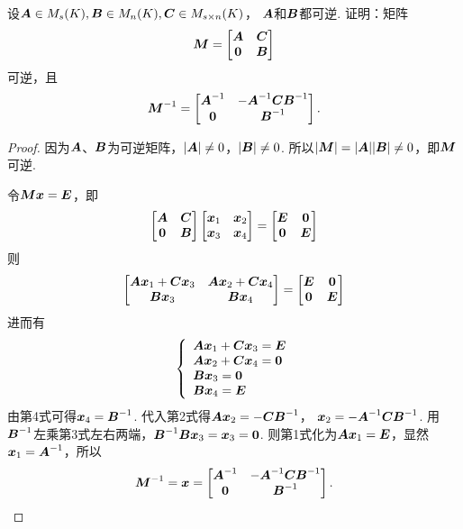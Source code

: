 \begin{example}\label{example:可逆矩阵.分块上三角矩阵的逆}
设\(\vb{A} \in M_s(K),
\vb{B} \in M_n(K),
\vb{C} \in M_{s \times n}(K)\)，
\(\vb{A}\)和\(\vb{B}\)都可逆.
证明：矩阵\[
	\vb{M} = \begin{bmatrix}
		\vb{A} & \vb{C} \\
		\vb0 & \vb{B}
	\end{bmatrix}
\]可逆，且\[
	\vb{M}^{-1} = \begin{bmatrix}
		\vb{A}^{-1} & -\vb{A}^{-1} \vb{C} \vb{B}^{-1} \\
		\vb0 & \vb{B}^{-1}
	\end{bmatrix}.
\]
\begin{proof}
因为\(\vb{A}\)、\(\vb{B}\)为可逆矩阵，\(\abs{\vb{A}} \neq 0\)，\(\abs{\vb{B}} \neq 0\).
所以\(\abs{\vb{M}}=\abs{\vb{A}}\abs{\vb{B}} \neq 0\)，即\(\vb{M}\)可逆.

令\(\vb{M}\vb{x}=\vb{E}\)，即\[
	\begin{bmatrix}
		\vb{A} & \vb{C} \\
		\vb0 & \vb{B}
	\end{bmatrix}
	\begin{bmatrix}
		\vb{x}_1 & \vb{x}_2 \\
		\vb{x}_3 & \vb{x}_4
	\end{bmatrix}
	= \begin{bmatrix}
		\vb{E} & \vb0 \\
		\vb0 & \vb{E}
	\end{bmatrix}
\]则\[
	\begin{bmatrix}
		\vb{A}\vb{x}_1+\vb{C}\vb{x}_3 & \vb{A}\vb{x}_2+\vb{C}\vb{x}_4 \\
		\vb{B}\vb{x}_3 & \vb{B}\vb{x}_4
	\end{bmatrix}
	= \begin{bmatrix}
		\vb{E} & \vb0 \\
		\vb0 & \vb{E}
	\end{bmatrix}
\]
进而有\[
	\left\{ \begin{array}{l}
		\vb{A}\vb{x}_1+\vb{C}\vb{x}_3 = \vb{E} \\
		\vb{A}\vb{x}_2+\vb{C}\vb{x}_4 = \vb0 \\
		\vb{B}\vb{x}_3 = \vb0 \\
		\vb{B}\vb{x}_4 = \vb{E}
	\end{array} \right.
\]
由第4式可得\(\vb{x}_4 = \vb{B}^{-1}\).
代入第2式得\(\vb{A}\vb{x}_2=-\vb{C}\vb{B}^{-1}\)，
\(\vb{x}_2=-\vb{A}^{-1}\vb{C}\vb{B}^{-1}\).
用\(\vb{B}^{-1}\)左乘第3式左右两端，\(\vb{B}^{-1}\vb{B}\vb{x}_3=\vb{x}_3=\vb0\).
则第1式化为\(\vb{A}\vb{x}_1=\vb{E}\)，显然\(\vb{x}_1=\vb{A}^{-1}\)，所以\[
	\vb{M}^{-1} = \vb{x} = \begin{bmatrix}
		\vb{A}^{-1} & -\vb{A}^{-1}\vb{C}\vb{B}^{-1} \\
		\vb0 & \vb{B}^{-1}
	\end{bmatrix}.
	\qedhere
\]
\end{proof}
\end{example}

